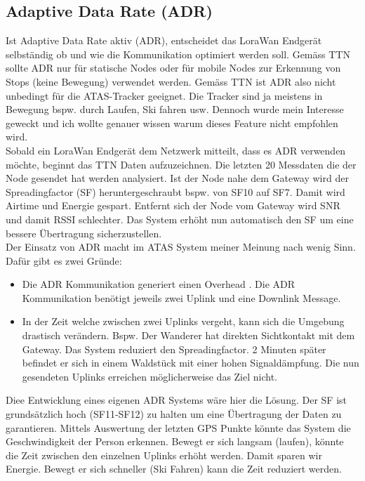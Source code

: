 \documentclass[11pt,english,german]{report}
\theoremstyle{definition}
\begin{document}
\subsection{Adaptive Data Rate (ADR)}
Ist Adaptive Data Rate aktiv (ADR), entscheidet das LoraWan Endgerät selbständig ob und wie die Kommunikation optimiert werden soll. Gemäss TTN \cite{ADRTTN} sollte ADR nur für statische Nodes oder für mobile Nodes zur Erkennung von Stops (keine Bewegung) verwendet werden. Gemäss TTN ist ADR also nicht unbedingt für die ATAS-Tracker geeignet. Die Tracker sind ja meistens in Bewegung bspw. durch Laufen, Ski fahren usw. Dennoch wurde mein Interesse geweckt und ich wollte genauer wissen warum dieses Feature nicht empfohlen wird.\\[0.3cm]
Sobald ein LoraWan Endgerät dem Netzwerk mitteilt, dass es ADR verwenden möchte, beginnt das TTN Daten aufzuzeichnen. Die letzten 20 Messdaten die der Node gesendet hat werden analysiert. Ist der Node nahe dem Gateway wird der Spreadingfactor (SF) heruntergeschraubt bspw. von SF10 auf SF7. Damit wird Airtime und Energie gespart. Entfernt sich der Node vom Gateway wird SNR und damit RSSI schlechter. Das System erhöht nun automatisch  den SF um eine bessere Übertragung sicherzustellen.\\[0.3cm]
Der Einsatz von ADR macht im ATAS System meiner Meinung nach wenig Sinn. Dafür gibt es zwei Gründe:
\begin{itemize}
	\item Die ADR Kommunikation generiert einen Overhead \cite{adroverhead}. Die ADR Kommunikation benötigt jeweils zwei Uplink und eine Downlink Message. 
	\item In der Zeit welche zwischen zwei Uplinks vergeht, kann sich die Umgebung drastisch verändern. Bspw. Der Wanderer hat direkten Sichtkontakt mit dem Gateway. Das System reduziert den Spreadingfactor. 2 Minuten später befindet er sich in einem Waldstück mit einer hohen Signaldämpfung. Die nun gesendeten Uplinks erreichen möglicherweise das Ziel nicht.
\end{itemize}Diee Entwicklung eines eigenen ADR Systems wäre hier die Lösung. Der SF ist grundsätzlich hoch (SF11-SF12) zu halten um eine Übertragung der Daten zu garantieren. Mittels Auswertung der letzten GPS Punkte könnte das System die Geschwindigkeit der Person erkennen. Bewegt er sich langsam (laufen), könnte die Zeit zwischen den einzelnen Uplinks erhöht werden. Damit sparen wir Energie. Bewegt er sich schneller (Ski Fahren) kann die Zeit reduziert werden. 
\end{document}
